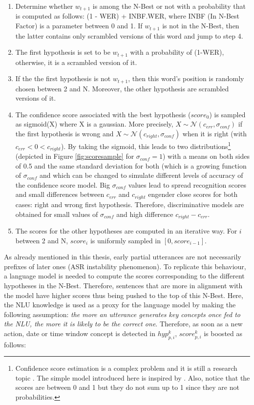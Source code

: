 					\begin{enumerate}
						\item Determine whether $w_{t+1}$ is among the N-Best or not with a probability that is computed as follows: (1 - WER) + INBF.WER, where INBF (In N-Best Factor) is a parameter between 0 and 1. If $w_{t+1}$ is not in the N-Best, then the latter contains only scrambled versions of this word and jump to step 4.
							\item The first hypothesis is set to be $w_{t+1}$ with a probability of (1-WER), otherwise, it is a scrambled version of it.
							\item If the the first hypothesis is not $w_{t+1}$, then this word's position is randomly chosen between 2 and N. Moreover, the other hypothesis are scrambled versions of it.
							\item The confidence score associated with the best hypothesis ($score_0$) is sampled as sigmoid(X) where X is a gaussian. More precisely, $X \sim \mathcal{N} (c_{err},\sigma_{conf})$ if the first hypothesis is wrong and $X \sim \mathcal{N} (c_{right},\sigma_{conf})$ when it is right (with $c_{err} < 0 < c_{right}$). By taking the sigmoid, this leads to two distributions\footnote{Confidence score estimation is a complex problem and it is still a research topic \cite{Jiang2005,Seigel2011}. The simple model introduced here is inspired by \cite{Pietquin2005}. Also, notice that the scores are between 0 and 1 but they do not sum up to 1 since they are not probabilities.} (depicted in Figure \ref{fig:scoresample} for $\sigma_{conf} = 1$) with a means on both sides of 0.5 and the same standard deviation for both (which is a growing function of $\sigma_{conf}$ and which can be changed to simulate different levels of accuracy of the confidence score model. Big $\sigma_{conf}$ values lead to spread recognition scores and small differences between $c_{err}$ and $c_{right}$ engender close scores for both cases: right and wrong first hypothesis. Therefore, discriminative models are obtained for small values of $\sigma_{conf}$ and high difference $c_{right}-c_{err}$.
							\item The scores for the other hypotheses are computed in an iterative way. For $i$ between 2 and N, $score_i$ is uniformly sampled in $[0,score_{i-1}]$.
					\end{enumerate}
					
					As already mentioned in this thesis, early partial utterances are not necessarily prefixes of later ones (ASR instability phenomenon). To replicate this behaviour, a language model is needed to compute the scores corresponding to the different hypotheses in the N-Best. Therefore, sentences that are more in alignment with the model have higher scores thus being pushed to the top of this N-Best. Here, the NLU knowledge is used as a proxy for the language model by making the following assumption: \textit{the more an utterance generates key concepts once fed to the NLU, the more it is likely to be the correct one}. Therefore, as soon as a new action, date or time window concept is detected in $hyp^k_{p,i}$, $score^k_{p,i}$ is boosted as follows:
					
